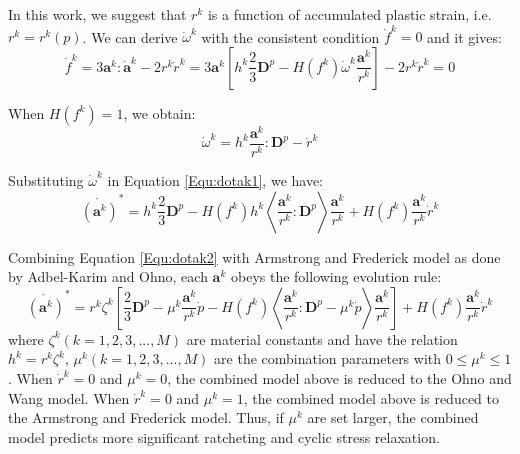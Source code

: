 In this work, we suggest that $r^k$ is a function of accumulated plastic strain, i.e. ${r^k} = {r^k}\left( p \right)$. We can derive ${\dot \omega ^k}$ with the consistent condition ${\dot f^k} = 0$ and it gives:
\begin{equation}
\label{Equ:dotfk}
{\dot f^k} = 3{{\mathbf{a}}^k}:{{\mathbf{\dot a}}^k} - 2{r^k}{\dot r^k} = 3{{\mathbf{a}}^k}\left[ {{h^k}\frac{2}{3}{{\mathbf{D}}^p} - H\left( {{f^k}} \right){{\dot \omega }^k}\frac{{{{\mathbf{a}}^k}}}{{{r^k}}}} \right] - 2{r^k}{\dot r^k} = 0
\end{equation}

When $H\left( {{f^k}} \right) = 1$, we obtain:
\begin{equation}
\label{Equ:dotomegak}
{\dot \omega ^k} = {h^k}\frac{{{{\mathbf{a}}^k}}}{{{r^k}}}:{{\mathbf{D}}^p} - {\dot r^k}
\end{equation}

Substituting ${\dot \omega ^k}$ in Equation \ref{Equ:dotak1}, we have:
\begin{equation}
\label{Equ:dotak2}
\mathring{\left({\mathbf{a}}^{k}\right)}^* = {h^k}\frac{2}{3}{{\mathbf{D}}^p} - H\left( {{f^k}} \right){h^k}\left\langle {\frac{{{{\mathbf{a}}^k}}}{{{r^k}}}:{{\mathbf{D}}^p}} \right\rangle \frac{{{{\mathbf{a}}^k}}}{{{r^k}}} + H\left( {{f^k}} \right)\frac{{{{\mathbf{a}}^k}}}{{{r^k}}}{\dot r^k}
\end{equation}

Combining Equation \ref{Equ:dotak2} with Armstrong and Frederick model as done by Adbel-Karim and Ohno, each ${{\mathbf{a}}^k}$ obeys the following evolution rule:
\begin{equation}
\label{Equ:dotak3}
\mathring{\left({\mathbf{a}}^{k}\right)}^* = {r^k}{\zeta ^k}\left[ {\frac{2}{3}{{\mathbf{D}}^p} - {\mu ^k}\frac{{{{\mathbf{a}}^k}}}{{{r^k}}}\dot p - H\left( {{f^k}} \right)\left\langle {\frac{{{{\mathbf{a}}^k}}}{{{r^k}}}:{{\mathbf{D}}^p} - {\mu ^k}\dot p} \right\rangle \frac{{{{\mathbf{a}}^k}}}{{{r^k}}}} \right] + H\left( {{f^k}} \right)\frac{{{{\mathbf{a}}^k}}}{{{r^k}}}{\dot r^k}
\end{equation}
where ${\zeta ^k}( k = 1,2,3,...,M )$ are material constants and have the relation ${h^k} = {r^k}{\zeta ^k}$, ${\mu ^k}( k = 1,2,3,...,M )$ are the combination parameters with $0 \leqslant {\mu ^k} \leqslant 1$. When ${\dot r^k} = 0$ and ${\mu ^k} = 0$, the combined model above is reduced to the Ohno and Wang model. When ${\dot r^k} = 0$ and ${\mu ^k} = 1$, the combined model above is reduced to the Armstrong and Frederick model. Thus, if ${\mu ^k}$ are set larger, the combined model predicts more significant ratcheting and cyclic stress relaxation.

